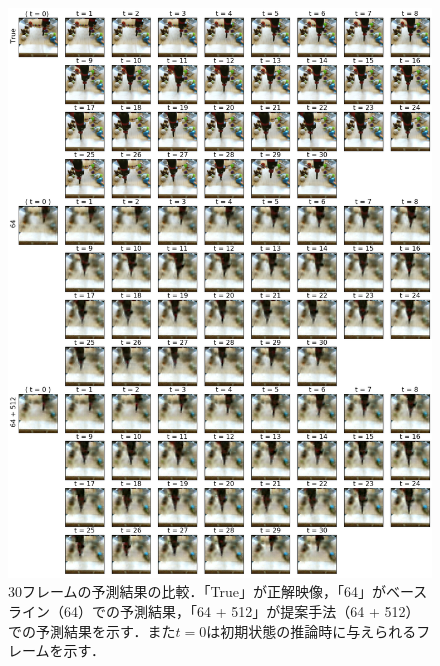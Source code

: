 \begin{figure}[tbp]
    \begin{center}
        \includegraphics[width=0.95\linewidth]{./figures/pred_long.png}
        \caption[30フレームの予測結果の比較]{30フレームの予測結果の比較．「True」が正解映像，「64」がベースライン（64）での予測結果，「64 + 512」が提案手法（64 + 512）での予測結果を示す．また$t = 0$は初期状態の推論時に与えられるフレームを示す．}
        \label{fig:pred_long}
    \end{center}
\end{figure}



